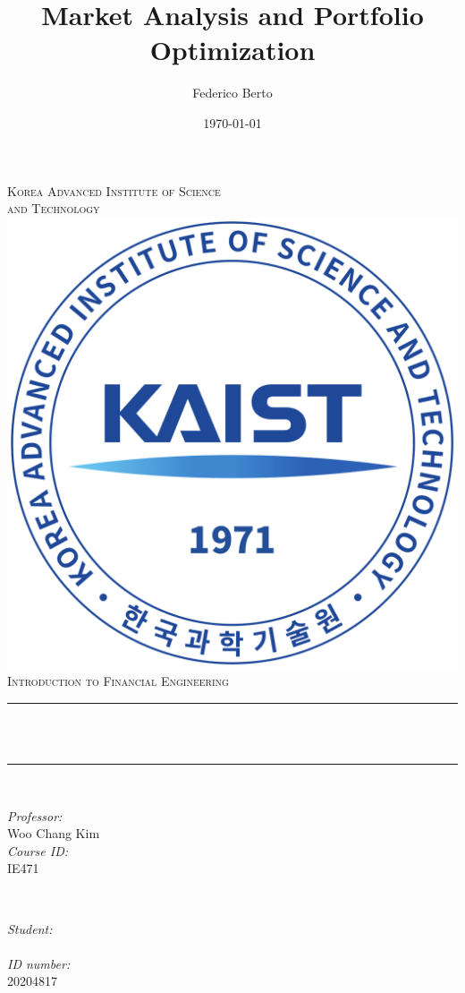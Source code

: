 \documentclass[12pt]{article}
\title{Market Analysis and Portfolio Optimization}
\author{Federico Berto}
\date{\today}
\makeatletter
\newcommand{\professor}{Woo Chang Kim}
\newcommand{\studentid}{20204817}
\newcommand{\coursename}{Introduction to Financial Engineering}
\newcommand{\courseid}{IE471}
\newcommand{\firstuniversityline}{Korea Advanced Institute of Science} %
\newcommand{\seconduniversityline}{and Technology} %
\let\thetitle\@title
\let\theauthor\@author
\makeatother
\begin{document}
\begin{titlepage}
	\centering
    \textsc{\LARGE  \firstuniversityline \\ \smallskip \seconduniversityline}\\[1 cm]	%
    \includegraphics[scale = 0.18]{images/university_main_logo.png}\\[1.5 cm]	%
    
	\textsc{\Large \coursename}\\[0.5 cm]
	\rule{\linewidth}{0.2 mm} \\[0.4 cm]
	{ \huge \bfseries {\thetitle}}\\
	\rule{\linewidth}{0.2 mm} \\[1.5 cm]
	
	\begin{minipage}{0.5\textwidth}
		\begin{flushleft} \large
			\emph{Professor:}\\
		    \professor \\ [0.5cm]
            \emph{Course ID:}\\
            \courseid
			\end{flushleft}
			\end{minipage}~
			\begin{minipage}{0.4\textwidth}
			\begin{flushright} \large
			\emph{Student:} \\
			\theauthor \\[0.5cm]
			\emph{ID number:}\\
			\studentid \\
		\end{flushright}
	\end{minipage}\\[2 cm]
	
\end{titlepage}
\end{document}
